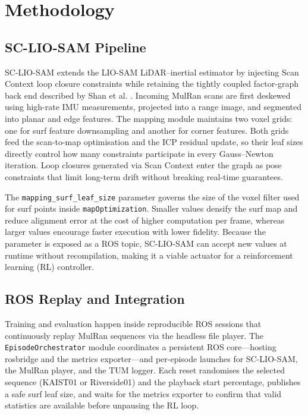 \chapter[Methodology]{Methodology}
\label{Chap:Methodology}



\section{SC-LIO-SAM Pipeline}
SC-LIO-SAM extends the LIO-SAM LiDAR–inertial estimator by injecting Scan Context loop closure constraints while retaining the tightly coupled factor-graph back end described by Shan et al. \cite{shan_2020_liosam}. Incoming MulRan scans \cite{kim_2020_mulran} are first deskewed using high-rate IMU measurements, projected into a range image, and segmented into planar and edge features. The mapping module maintains two voxel grids: one for surf feature downsampling and another for corner features. Both grids feed the scan-to-map optimisation and the ICP residual update, so their leaf sizes directly control how many constraints participate in every Gauss–Newton iteration. Loop closures generated via Scan Context \cite{gkim-2018-iros} enter the graph as pose constraints that limit long-term drift without breaking real-time guarantees.

The \texttt{mapping\_surf\_leaf\_size} parameter governs the size of the voxel filter used for surf points inside \texttt{mapOptimization}. Smaller values densify the surf map and reduce alignment error at the cost of higher computation per frame, whereas larger values encourage faster execution with lower fidelity. Because the parameter is exposed as a ROS topic, SC-LIO-SAM can accept new values at runtime without recompilation, making it a viable actuator for a reinforcement learning (RL) controller.

\section{ROS Replay and Integration}
Training and evaluation happen inside reproducible ROS sessions that continuously replay MulRan sequences via the headless file player. The \texttt{EpisodeOrchestrator} module coordinates a persistent ROS core—hosting rosbridge and the metrics exporter—and per-episode launches for SC-LIO-SAM, the MulRan player, and the TUM logger. Each reset randomises the selected sequence (KAIST01 or Riverside01) and the playback start percentage, publishes a safe surf leaf size, and waits for the metrics exporter to confirm that valid statistics are available before unpausing the RL loop.


